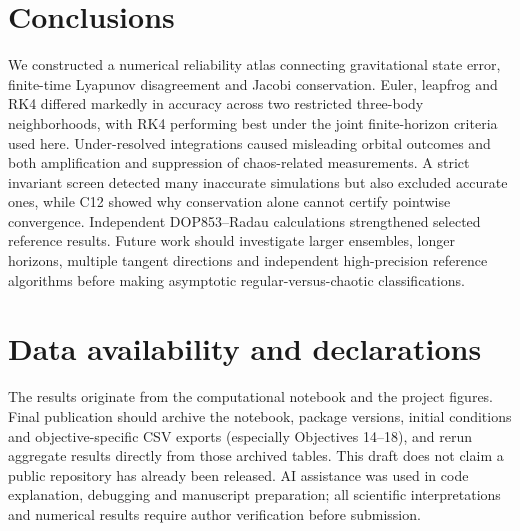 \documentclass[10pt,letterpaper,twocolumn]{article}
\begin{document}
\section{Conclusions}
We constructed a numerical reliability atlas connecting gravitational state error, finite-time Lyapunov disagreement and Jacobi conservation. Euler, leapfrog and RK4 differed markedly in accuracy across two restricted three-body neighborhoods, with RK4 performing best under the joint finite-horizon criteria used here. Under-resolved integrations caused misleading orbital outcomes and both amplification and suppression of chaos-related measurements. A strict invariant screen detected many inaccurate simulations but also excluded accurate ones, while C12 showed why conservation alone cannot certify pointwise convergence. Independent DOP853--Radau calculations strengthened selected reference results. Future work should investigate larger ensembles, longer horizons, multiple tangent directions and independent high-precision reference algorithms before making asymptotic regular-versus-chaotic classifications.

\section*{Data availability and declarations}
The results originate from the computational notebook and the project figures. Final publication should archive the notebook, package versions, initial conditions and objective-specific CSV exports (especially Objectives 14--18), and rerun aggregate results directly from those archived tables. This draft does not claim a public repository has already been released. AI assistance was used in code explanation, debugging and manuscript preparation; all scientific interpretations and numerical results require author verification before submission.
\end{document}
